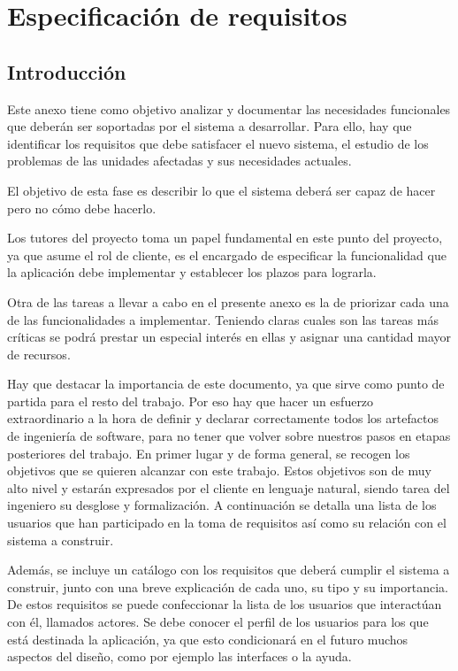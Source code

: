 \chapter{Especificación de requisitos}

\section{Introducción}
Este anexo tiene como objetivo analizar y documentar las necesidades funcionales que deberán ser soportadas por el sistema a desarrollar. Para  ello, hay que identificar los requisitos que debe satisfacer el nuevo sistema, el estudio de los problemas de las unidades afectadas y sus necesidades actuales.

El objetivo de esta fase es describir lo que el sistema deberá ser capaz de hacer pero no cómo debe hacerlo.

Los tutores del proyecto toma un papel fundamental en este punto del proyecto, ya que asume el rol de cliente, es el encargado de especificar la funcionalidad que la aplicación debe implementar y establecer los plazos para lograrla.

Otra de las tareas a llevar a cabo en el presente anexo es la de priorizar cada una de las funcionalidades a implementar. Teniendo claras cuales son las tareas más críticas se podrá prestar un especial interés en ellas y asignar una cantidad mayor de recursos.

Hay que destacar la importancia de este documento, ya que sirve como punto de partida para el resto del trabajo. Por eso hay que hacer un esfuerzo extraordinario a la hora de definir y declarar correctamente todos los artefactos de ingeniería de software, para no tener que volver sobre nuestros pasos en etapas posteriores del trabajo. En primer lugar y de forma general, se recogen los objetivos que se quieren alcanzar con este trabajo. Estos objetivos son de muy alto nivel y estarán expresados por el cliente en lenguaje natural, siendo tarea del ingeniero su desglose y formalización. A continuación se detalla una lista de los usuarios que han participado en la toma de requisitos así como su relación con el sistema a construir.

Además, se incluye un catálogo con los requisitos que deberá cumplir el sistema a construir, junto con una breve explicación de cada uno, su tipo y su importancia. De estos requisitos se puede confeccionar la lista de los usuarios que interactúan con él, llamados actores. Se debe conocer el perfil de los usuarios para los que está destinada la aplicación, ya que esto condicionará en el futuro muchos aspectos del diseño, como por ejemplo las interfaces o la ayuda.
\newpage



